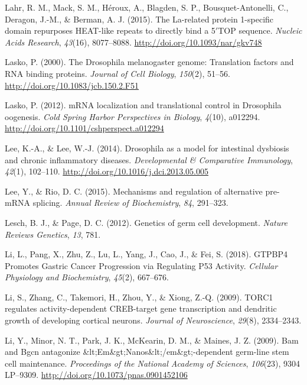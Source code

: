 \documentclass[12pt,oneside]{reedthesis}
\newlength{\cslhangindent}
\newenvironment{cslreferences}%
  {\setlength{\parindent}{0pt}%
  \everypar{\setlength{\hangindent}{\cslhangindent}}\ignorespaces}%
  {\par}
\begin{document}
\begin{cslreferences}
\leavevmode\hypertarget{ref-lahrLarelatedProtein1specific2015}{}%
Lahr, R. M., Mack, S. M., Héroux, A., Blagden, S. P., Bousquet-Antonelli, C., Deragon, J.-M., \& Berman, A. J. (2015). The La-related protein 1-specific domain repurposes HEAT-like repeats to directly bind a 5\({'}\)TOP sequence. \emph{Nucleic Acids Research}, \emph{43}(16), 8077--8088. \url{http://doi.org/10.1093/nar/gkv748}

\leavevmode\hypertarget{ref-Lasko2000}{}%
Lasko, P. (2000). The Drosophila melanogaster genome: Translation factors and RNA binding proteins. \emph{Journal of Cell Biology}, \emph{150}(2), 51--56. \url{http://doi.org/10.1083/jcb.150.2.F51}

\leavevmode\hypertarget{ref-Lasko2012a}{}%
Lasko, P. (2012). mRNA localization and translational control in Drosophila oogenesis. \emph{Cold Spring Harbor Perspectives in Biology}, \emph{4}(10), a012294. \url{http://doi.org/10.1101/cshperspect.a012294}

\leavevmode\hypertarget{ref-Lee2014c}{}%
Lee, K.-A., \& Lee, W.-J. (2014). Drosophila as a model for intestinal dysbiosis and chronic inflammatory diseases. \emph{Developmental \& Comparative Immunology}, \emph{42}(1), 102--110. \url{http://doi.org/10.1016/j.dci.2013.05.005}

\leavevmode\hypertarget{ref-Lee2015}{}%
Lee, Y., \& Rio, D. C. (2015). Mechanisms and regulation of alternative pre-mRNA splicing. \emph{Annual Review of Biochemistry}, \emph{84}, 291--323.

\leavevmode\hypertarget{ref-Lesch2012b}{}%
Lesch, B. J., \& Page, D. C. (2012). Genetics of germ cell development. \emph{Nature Reviews Genetics}, \emph{13}, 781.

\leavevmode\hypertarget{ref-Li2018a}{}%
Li, L., Pang, X., Zhu, Z., Lu, L., Yang, J., Cao, J., \& Fei, S. (2018). GTPBP4 Promotes Gastric Cancer Progression via Regulating P53 Activity. \emph{Cellular Physiology and Biochemistry}, \emph{45}(2), 667--676.

\leavevmode\hypertarget{ref-Li2009n}{}%
Li, S., Zhang, C., Takemori, H., Zhou, Y., \& Xiong, Z.-Q. (2009). TORC1 regulates activity-dependent CREB-target gene transcription and dendritic growth of developing cortical neurons. \emph{Journal of Neuroscience}, \emph{29}(8), 2334--2343.

\leavevmode\hypertarget{ref-Li2009h}{}%
Li, Y., Minor, N. T., Park, J. K., McKearin, D. M., \& Maines, J. Z. (2009). Bam and Bgcn antagonize \&lt;Em\&gt;Nanos\&lt;/em\&gt;-dependent germ-line stem cell maintenance. \emph{Proceedings of the National Academy of Sciences}, \emph{106}(23), 9304 LP--9309. \url{http://doi.org/10.1073/pnas.0901452106}


\end{cslreferences}
\end{document}
